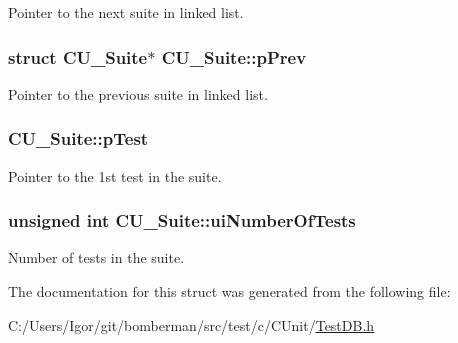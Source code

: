 Pointer to the next suite in linked list. 

\hypertarget{struct_c_u___suite_aa161293fb2ba337e52e1f6c9f5d68448}{
\subsubsection[{p\+Prev}]{\setlength{\rightskip}{0pt plus 5cm}struct {\bf C\+U\+\_\+\+Suite}$\ast$ C\+U\+\_\+\+Suite\+::p\+Prev}}\label{struct_c_u___suite_aa161293fb2ba337e52e1f6c9f5d68448}


Pointer to the previous suite in linked list. 

\hypertarget{struct_c_u___suite_ad56c4b9f273fdc8c3f504b62178dfdd6}{
\subsubsection[{p\+Test}]{ C\+U\+\_\+\+Suite\+::p\+Test}}\label{struct_c_u___suite_ad56c4b9f273fdc8c3f504b62178dfdd6}


Pointer to the 1st test in the suite. 

\hypertarget{struct_c_u___suite_ac35747775ea5ffbb4cc1a2eb17dd1ca3}{
\subsubsection[{ui\+Number\+Of\+Tests}]{\setlength{\rightskip}{0pt plus 5cm}unsigned int C\+U\+\_\+\+Suite\+::ui\+Number\+Of\+Tests}}\label{struct_c_u___suite_ac35747775ea5ffbb4cc1a2eb17dd1ca3}


Number of tests in the suite. 



The documentation for this struct was generated from the following file\+:\begin{DoxyCompactItemize}
\item 
C\+:/\+Users/\+Igor/git/bomberman/src/test/c/\+C\+Unit/\hyperlink{_test_d_b_8h}{Test\+D\+B.\+h}\end{DoxyCompactItemize}
